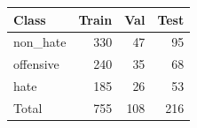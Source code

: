 \begin{tabular}{lrrr}
\toprule
Class & Train & Val & Test \\
\midrule
non_hate & 330 & 47 & 95 \\
offensive & 240 & 35 & 68 \\
hate & 185 & 26 & 53 \\
\midrule
Total & 755 & 108 & 216 \\
\bottomrule
\end{tabular}